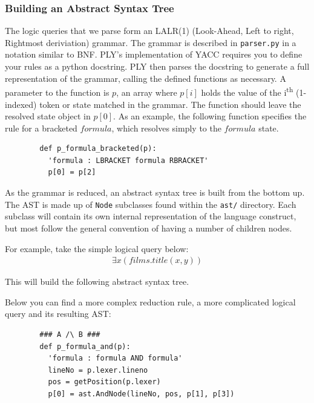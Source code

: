 \documentclass[a4paper, 11pt]{article}
\begin{document}
      \subsubsection{Building an Abstract Syntax Tree}

      The logic queries that we parse form an LALR(1) (Look-Ahead, Left to
      right, Rightmost deriviation) grammar\cite{sittingacrossthere}. The
      grammar is described in \texttt{parser.py} in a notation similar to BNF.
      PLY's implementation of YACC requires you to define your rules as a
      python docstring. PLY then parses the docstring to generate a full
      representation of the grammar, calling the defined functions as
      necessary. A parameter to the function is $p$, an array where $p[i]$
      holds the value of the i\textsuperscript{th} (1-indexed) token or state matched in the
      grammar. The function should leave the resolved state object in $p[0]$.
      As an example, the following function specifies the rule for a bracketed
      $formula$, which resolves simply to the $formula$ state. 
      \begin{verbatim}
        def p_formula_bracketed(p):
          'formula : LBRACKET formula RBRACKET'
          p[0] = p[2]
      \end{verbatim}

      As the grammar is reduced, an abstract syntax tree is built from the
      bottom up. The AST is made up of \texttt{Node} subclasses found within
      the \texttt{ast/}
      directory. Each subclass will contain its own internal representation of
      the language construct, but most follow the general convention of having
      a number of children nodes.

      For example, take the simple logical query below:
      \begin{multline}
        \exists x(films.title(x, y))
      \end{multline}

      This will build the following abstract syntax tree.


      Below you can find a more complex reduction rule, a more complicated
      logical query and its resulting AST:

      \begin{verbatim}
        ### A /\ B ###
        def p_formula_and(p):
          'formula : formula AND formula'
          lineNo = p.lexer.lineno
          pos = getPosition(p.lexer)
          p[0] = ast.AndNode(lineNo, pos, p[1], p[3])
      \end{verbatim}
\end{document}
